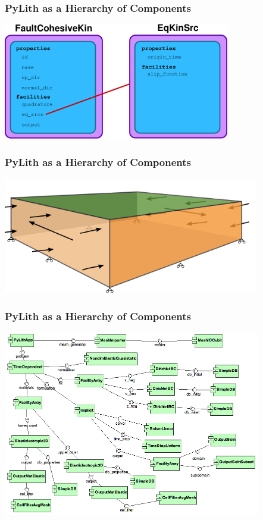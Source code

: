 \documentclass{beamer}
\begin{document}
\begin{frame}
  \frametitle{PyLith as a Hierarchy of Components}

  \vfill
  \begin{center}
    \includegraphics[height=2.0in]{figs/faultcohesivekin}
  \end{center}  
  \vfill

\end{frame}


\begin{frame}
  \frametitle{PyLith as a Hierarchy of Components}

  \vfill
  \begin{center}
    \includegraphics[height=2.0in]{figs/step01_diagram}
  \end{center}  
  \vfill

\end{frame}


\begin{frame}
  \frametitle{PyLith as a Hierarchy of Components}
  \includegraphics[height=3.2in]{figs/step01_components}
\end{frame}
\end{document}
